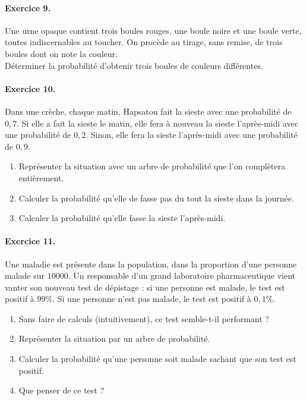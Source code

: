 \documentclass[11pt]{article}
\begin{document}
\paragraph{Exercice 9.} Une urne opaque contient trois boules rouges, une boule
noire et une boule verte, toutes indiscernables au toucher. On procède au
tirage, sans remise, de trois boules dont on note la couleur.\\
Déterminer la probabilité d'obtenir trois boules de couleurs différentes.

\paragraph{Exercice 10.} Dans une crèche, chaque matin, Hapsatou fait la sieste
avec une probabilité de $0,7$. Si elle a fait la sieste le matin, elle fera à
nouveau la sieste l'après-midi avec une probabilité de $0,2$. Sinon, elle fera
la sieste l'après-midi avec une probabilité de $0,9$.
\begin{enumerate}
  \item Représenter la situation avec un arbre de probabilité que l'on
    complètera entièrement.
  \item Calculer la probabilité qu'elle de fasse pas du tout la sieste dans la
    journée.
  \item Calculer la probabilité qu'elle fasse la sieste l'après-midi.
\end{enumerate}

\paragraph{Exercice 11.}
Une maladie est
présente dans la population, dans la proportion d'une personne malade sur
$10000$. Un responsable d'un grand laboratoire pharmaceutique vient
vanter son nouveau test de dépistage : si une personne est malade, le test est
positif à $99\%$. Si une personne n'est pas malade, le test est positif à
$0,1\%$.
\begin{enumerate}
  \item Sans faire de calculs (intuitivement), ce test semble-t-il performant ?
  \item Représenter la situation par un arbre de probabilité.
  \item Calculer la probabilité qu'une personne soit malade sachant que son test
    est positif.
  \item Que penser de ce test ?
\end{enumerate}
\end{document}
